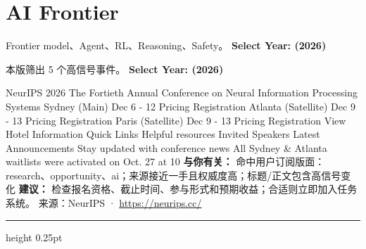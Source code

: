 \documentclass[10.5pt]{ctexart}
\begin{document}
\section*{AI Frontier}
{\color{ormuted} Frontier model、Agent、RL、Reasoning、Safety。}
\vspace{2mm}
{\LARGE\bfseries Select Year: (2026)}\par
\vspace{1mm}
{\color{ormuted} 本版筛出 5 个高信号事件。}
\vspace{3mm}
{\Large\bfseries Select Year: (2026)}\par
NeurIPS 2026 The Fortieth Annual Conference on Neural Information Processing Systems Sydney (Main) Dec 6 - 12 Pricing Registration Atlanta (Satellite) Dec 9 - 13 Pricing Registration Paris (Satellite) Dec 9 - 13 Pricing Registration View Hotel Information Quick Links Helpful resources Invited Speakers Latest Announcements Stay updated with conference news All Sydney \& Atlanta waitlists were activated on Oct. 27 at 10
\textbf{与你有关：} 命中用户订阅版面：research、opportunity、ai；来源接近一手且权威度高；标题/正文包含高信号变化
\textbf{建议：} 检查报名资格、截止时间、参与形式和预期收益；合适则立即加入任务系统。
{\footnotesize\color{ormuted} 来源：NeurIPS · \url{https://neurips.cc/}}
\vspace{4mm}
\hrule height 0.25pt
\vspace{3mm}
\end{document}
